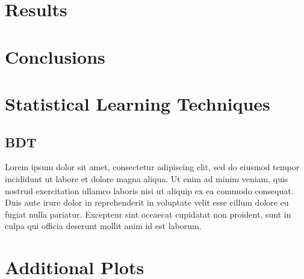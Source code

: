 \documentclass[12pt]{niuthesis}
\begin{document}
\chapter{Results}

\chapter{Conclusions}

\printbibliography


\appendix
    \chapter{Statistical Learning Techniques}
        \section{BDT}
            Lorem ipsum dolor sit amet, consectetur adipiscing elit, sed do eiusmod tempor incididunt ut labore et dolore magna aliqua. Ut enim ad minim veniam, quis nostrud exercitation ullamco laboris nisi ut aliquip ex ea commodo consequat. Duis aute irure dolor in reprehenderit in voluptate velit esse cillum dolore eu fugiat nulla pariatur. Excepteur sint occaecat cupidatat non proident, sunt in culpa qui officia deserunt mollit anim id est laborum.

    \chapter{Additional Plots}
\end{document}
